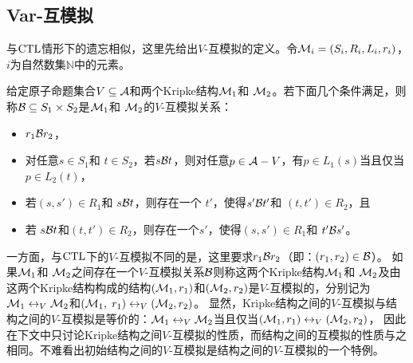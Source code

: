 \subsection{Var-互模拟}
与$\textrm{CTL}$情形下的遗忘相似，这里先给出$V$-互模拟的定义。令${\cal M}_i = (S_i, R_i, L_i, r_i)$，$i$为自然数集$\mathbb{N}$中的元素。
\begin{definition}[$V$-互模拟]\label{def:VB}
	给定原子命题集合$V \subseteq {\cal A}$和两个Kripke结构${\cal M}_1$和 ${\cal M}_2$。若下面几个条件满足，则称${\cal B}\subseteq S_1 \times S_2$是${\cal M}_1$和 ${\cal M}_2$的$V$-互模拟关系：
	\begin{itemize}
		\item $r_1 {\cal B} r_2$，
		\item 对任意$s\in S_1$和 $t\in S_2$，若$s {\cal B} t$，则对任意$p \in {\cal A}- V$，有$p \in L_1(s)$当且仅当 $p \in L_2(t)$，
		\item 若$(s, s')\in R_1$和 $s {\cal B} t$，则存在一个 $t'$，使得$s' {\cal B} t'$和 $(t, t')\in R_2$，且
		\item 若 $s {\cal B} t$和$(t, t')\in R_2$，则存在一个$s'$，使得$(s, s')\in R_1$和 $t' {\cal B} s'$。
	\end{itemize}
\end{definition}

一方面，与$\textrm{CTL}$下的$V$-互模拟不同的是，这里要求$r_1 {\cal B} r_2$（即：$(r_1,r_2)\in {\cal B}$）。
如果${\cal M}_1$和 ${\cal M}_2$之间存在一个$V$-互模拟关系${\cal B}$则称这两个Kripke结构${\cal M}_1$和 ${\cal M}_2$及由这两个Kripke结构构成的结构$({\cal M}_1,r_1)$和$({\cal M}_2,r_2)$是$V$-互模拟的，分别记为${\cal M}_1 \leftrightarrow_V {\cal M}_2$和$({\cal M}_1,$ $r_1) \leftrightarrow_V ({\cal M}_2,r_2)$。
显然，Kripke结构之间的$V$-互模拟与结构之间的$V$-互模拟是等价的：${\cal M}_1 \leftrightarrow_V {\cal M}_2$当且仅当$({\cal M}_1,r_1) \leftrightarrow_V ({\cal M}_2,r_2)$， 因此在下文中只讨论Kripke结构之间$V$-互模拟的性质，而结构之间的互模拟的性质与之相同。不难看出初始结构之间的$V$-互模拟是结构之间的$V$-互模拟的一个特例。


